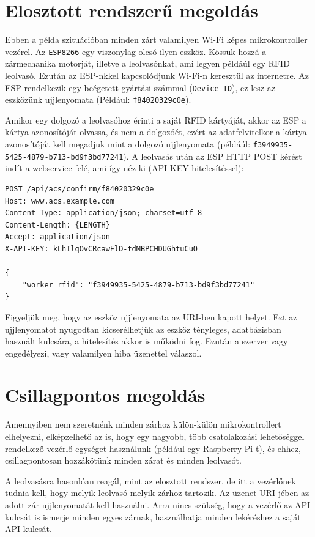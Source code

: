 \documentclass[a4paper,12pt]{thesis-ekf}
\theoremstyle{definition}
\begin{document}
		\section{Elosztott rendszerű megoldás}
			Ebben a példa szituációban minden zárt valamilyen Wi-Fi képes mikrokontroller vezérel. Az \texttt{ESP8266} egy viszonylag olcsó ilyen eszköz. Kössük hozzá a zármechanika motorját, illetve a leolvasónkat, ami legyen példáúl egy RFID leolvasó. Ezután az ESP-nkkel kapcsolódjunk Wi-Fi-n keresztül az internetre. Az ESP rendelkezik egy beégetett gyártási számmal (\texttt{Device ID}), ez lesz az eszközünk ujjlenyomata (Például: \texttt{f84020329c0e}).
			
			Amikor egy dolgozó a leolvasóhoz érinti a saját RFID kártyáját, akkor az ESP a kártya azonosítóját olvassa, és nem a dolgozóét, ezért az adatfelvitelkor a kártya azonosítóját kell megadjuk mint a dolgozó ujjlenyomata (példáúl: \texttt{f3949935-5425-4879-b713-bd9f3bd77241}). A leolvasás után az ESP HTTP POST kérést indít a webservice felé, ami így néz ki (API-KEY hitelesítéssel):
			
			\begin{lstlisting}[caption={Elosztott rendszer HTTP k\'er\'ese},captionpos=b]
POST /api/acs/confirm/f84020329c0e
Host: www.acs.example.com
Content-Type: application/json; charset=utf-8
Content-Length: {LENGTH}
Accept: application/json
X-API-KEY: kLhIlqOvCRcawFlD-tdMBPCHDUGhtuCuO

{
	"worker_rfid": "f3949935-5425-4879-b713-bd9f3bd77241"
}
			\end{lstlisting}
			
			Figyeljük meg, hogy az eszköz ujjlenyomata az URI-ben kapott helyet. Ezt az ujjlenyomatot nyugodtan kicserélhetjük az eszköz tényleges, adatbázisban használt kulcsára, a hitelesítés akkor is működni fog. Ezután a szerver vagy engedélyezi, vagy valamilyen hiba üzenettel válaszol.
			
		\section{Csillagpontos megoldás}
			Amennyiben nem szeretnénk minden zárhoz külön-külön mikrokontrollert elhelyezni, elképzelhető az is, hogy egy nagyobb, több csatolakozási lehetőséggel rendelkező vezérlő egységet használunk (például egy Raspberry Pi-t), és ehhez, csillagpontosan hozzákötünk minden zárat és minden leolvasót. 
			
			A leolvasásra hasonlóan reagál, mint az elosztott rendszer, de itt a vezérlőnek tudnia kell, hogy melyik leolvasó melyik zárhoz tartozik. Az üzenet URI-jében az adott zár ujjlenyomatát kell használni. Arra nincs szükség, hogy a vezérlő az API kulcsát is ismerje minden egyes zárnak, használhatja minden lekéréshez a saját API kulcsát. 
			
\end{document}
